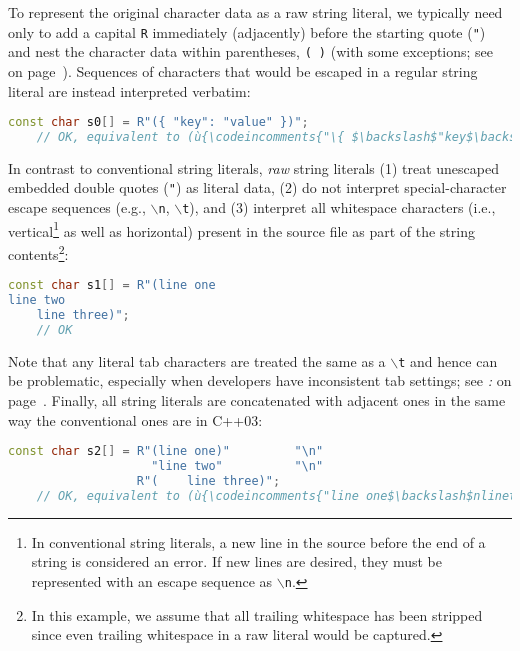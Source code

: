 \noindent To represent the original character
data as a raw string literal, we typically need only to add a capital \texttt{R} immediately
(adjacently) before the starting quote (\texttt{"}) and nest the
character data within parentheses, \texttt{(}~\texttt{)} (with some exceptions; see \textit{} on page~\pageref{collisions}). Sequences of
characters that would be escaped in a regular string literal are instead
interpreted verbatim:

\begin{lstlisting}[language=C++]
const char s0[] = R"({ "key": "value" })";
    // OK, equivalent to (ù{\codeincomments{"\{ $\backslash$"key$\backslash$": $\backslash$"value$\backslash$" \}"}}ù)
\end{lstlisting}

\noindent In contrast to conventional string literals, \emph{raw} string literals
(1) treat unescaped embedded double quotes (\texttt{"}) as literal data,
(2) do not interpret special-character escape sequences (e.g.,
\texttt{$\backslash$n}, \texttt{$\backslash$t}), and (3) interpret all
whitespace characters (i.e., vertical\footnote{In conventional string literals, a
new line in the source before the end of a string is considered an error.
If new lines are desired, they must be represented with an escape
sequence as \texttt{$\backslash$n}.} as well as horizontal) present in
the source file as part of the string contents{\cprotect\footnote{In
this example, we assume that all trailing whitespace has been stripped
since even trailing whitespace in a raw literal would be captured.}}:


\begin{lstlisting}[language=C++]
const char s1[] = R"(line one
line two
    line three)";
    // OK
\end{lstlisting}

\noindent Note that any literal tab characters are treated the same as a
\texttt{$\backslash$t} and hence can be problematic, especially when
developers have inconsistent tab settings; see \textit{: } on page~\pageref{unexpected-indentation}. Finally, all string literals are concatenated with
adjacent ones in the same way the conventional ones are in C++03:

\begin{lstlisting}[language=C++]
const char s2[] = R"(line one)"         "\n"
                    "line two"          "\n"
                  R"(    line three)";
    // OK, equivalent to (ù{\codeincomments{"line one$\backslash$nlinetwo$\backslash$n~~~~line three"}}ù)
\end{lstlisting}



